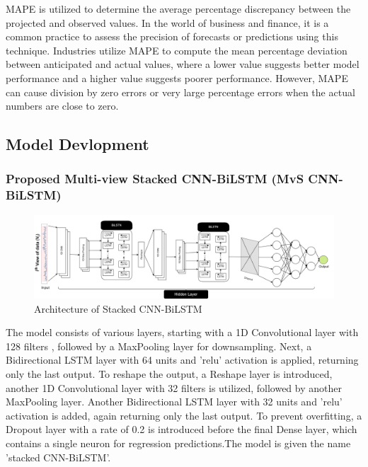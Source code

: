 \documentclass[a4paper,fleqn]{cas-sc}
\begin{document}
MAPE is utilized to determine the average percentage discrepancy between the projected and observed values. In the world of business and finance, it is a common practice to assess the precision of forecasts or predictions using this technique. Industries utilize MAPE to compute the mean percentage deviation between anticipated and actual values, where a lower value suggests better model performance and a higher value suggests poorer performance. However, MAPE can cause division by zero errors or very large percentage errors when the actual numbers are close to zero.




\subsection{Model Devlopment}
\subsubsection{Proposed Multi-view Stacked CNN-BiLSTM (MvS CNN-BiLSTM)}
\begin{figure}[h!]
	\centering
		\includegraphics[scale=0.5]{img/Prpose}
	  \caption{Architecture of Stacked CNN-BiLSTM}\label{prosed_cnn-bilstm}
\end{figure}

The model consists of various layers, starting with a 1D Convolutional layer with 128 filters , followed by a MaxPooling layer for downsampling. Next, a Bidirectional LSTM layer with 64 units and 'relu' activation is applied, returning only the last output. To reshape the output, a Reshape layer is introduced, another 1D Convolutional layer with 32 filters is utilized, followed by another MaxPooling layer. Another Bidirectional LSTM layer with 32 units and 'relu' activation is added, again returning only the last output. To prevent overfitting, a Dropout layer with a rate of 0.2 is introduced before the final Dense layer, which contains a single neuron for regression predictions.The model is given the name 'stacked CNN-BiLSTM'.
\end{document}
